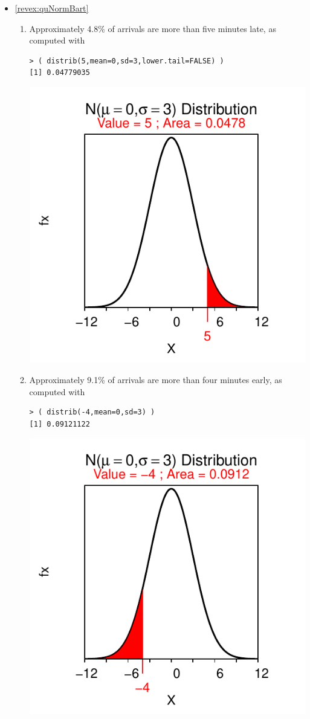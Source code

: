 \documentclass[10pt,openany]{book}\usepackage[]{graphicx}\usepackage[]{color}
\makeatletter
\newenvironment{kframe}{%
 \def\at@end@of@kframe{}%
 \ifinner\ifhmode%
  \def\at@end@of@kframe{\end{minipage}}%
  \begin{minipage}{\columnwidth}%
 \fi\fi%
 \def\FrameCommand##1{\hskip\@totalleftmargin \hskip-\fboxsep
 \colorbox{shadecolor}{##1}\hskip-\fboxsep
     \hskip-\linewidth \hskip-\@totalleftmargin \hskip\columnwidth}%
 \MakeFramed {\advance\hsize-\width
   \@totalleftmargin\z@ \linewidth\hsize
   \@setminipage}}%
 {\par\unskip\endMakeFramed%
 \at@end@of@kframe}
\newenvironment{knitrout}{}{} %
\makeatother
\begin{document}
\begin{itemize}
\begin{enumerate}
\begin{knitrout}
{}



\end{knitrout}
    \end{enumerate}

  \item \hypertarget{ans:quNormBart}{\ref{revex:quNormBart}}
    \begin{enumerate}
      \item Approximately 4.8\% of arrivals are more than five minutes late, as computed with
\begin{knitrout}
\color{fgcolor}\begin{kframe}
\begin{verbatim}
> ( distrib(5,mean=0,sd=3,lower.tail=FALSE) )
[1] 0.04779035
\end{verbatim}
\end{kframe}

{\centering \includegraphics[width=.4\linewidth]{Figs/unnamed-chunk-232-1} 

}



\end{knitrout}
      \item Approximately 9.1\% of arrivals are more than four minutes early, as computed with
\begin{knitrout}
\color{fgcolor}\begin{kframe}
\begin{verbatim}
> ( distrib(-4,mean=0,sd=3) )
[1] 0.09121122
\end{verbatim}
\end{kframe}

{\centering \includegraphics[width=.4\linewidth]{Figs/unnamed-chunk-233-1} 

}
\end{knitrout}
\end{enumerate}
\end{itemize}
\end{document}
